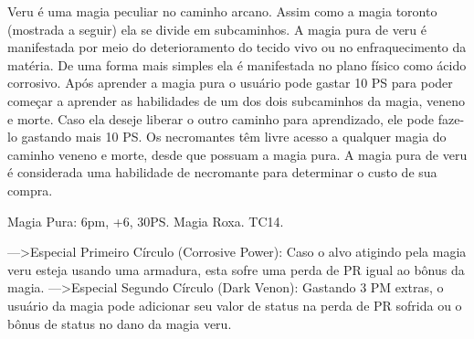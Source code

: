 Veru é uma magia peculiar no caminho arcano. Assim como a magia toronto (mostrada a seguir) ela se divide em subcaminhos. A magia pura de veru é manifestada por meio do deterioramento do tecido vivo ou no enfraquecimento da matéria. De uma forma mais simples ela é manifestada no plano físico como ácido corrosivo. Após aprender a magia pura o usuário pode gastar 10 PS para poder começar a aprender as habilidades de um dos dois subcaminhos da magia, veneno e morte. Caso ela deseje liberar o outro caminho para aprendizado, ele pode faze-lo gastando mais 10 PS. Os necromantes têm livre acesso a qualquer magia do caminho veneno e morte, desde que possuam a magia pura. A magia pura de veru é considerada uma habilidade de necromante para determinar o custo de sua compra.


Magia Pura: 6pm, +6, 30PS. Magia Roxa.  TC14. \newline

--->Especial Primeiro Círculo (Corrosive Power): Caso o alvo atigindo pela magia veru esteja usando uma armadura, esta sofre uma perda de PR igual ao bônus da magia. \newline
--->Especial Segundo Círculo (Dark Venon): Gastando 3 PM extras, o usuário da magia pode adicionar seu valor de status na perda de PR sofrida ou o bônus de status no dano da magia veru.

